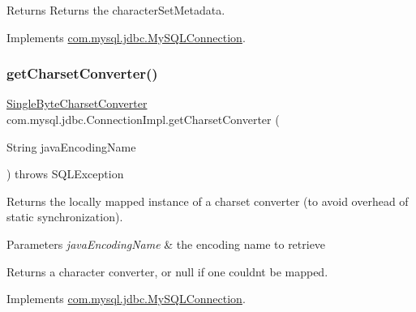 \begin{DoxyReturn}{Returns}
Returns the character\+Set\+Metadata. 
\end{DoxyReturn}


Implements \mbox{\hyperlink{interfacecom_1_1mysql_1_1jdbc_1_1_my_s_q_l_connection}{com.\+mysql.\+jdbc.\+My\+S\+Q\+L\+Connection}}.

\mbox{\label{classcom_1_1mysql_1_1jdbc_1_1_connection_impl_a641ccc3402b1c74a6f3bb9422cfc758b}} 
\subsubsection{\texorpdfstring{get\+Charset\+Converter()}{getCharsetConverter()}}
{\footnotesize\ttfamily \mbox{\hyperlink{classcom_1_1mysql_1_1jdbc_1_1_single_byte_charset_converter}{Single\+Byte\+Charset\+Converter}} com.\+mysql.\+jdbc.\+Connection\+Impl.\+get\+Charset\+Converter (\begin{DoxyParamCaption}\item[{String}]{java\+Encoding\+Name }\end{DoxyParamCaption}) throws S\+Q\+L\+Exception}

Returns the locally mapped instance of a charset converter (to avoid overhead of static synchronization).


\begin{DoxyParams}{Parameters}
{\em java\+Encoding\+Name} & the encoding name to retrieve \\
\hline
\end{DoxyParams}
\begin{DoxyReturn}{Returns}
a character converter, or null if one couldn\textquotesingle{}t be mapped. 
\end{DoxyReturn}


Implements \mbox{\hyperlink{interfacecom_1_1mysql_1_1jdbc_1_1_my_s_q_l_connection}{com.\+mysql.\+jdbc.\+My\+S\+Q\+L\+Connection}}.

